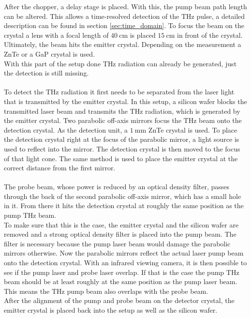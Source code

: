 After the chopper, a delay stage is placed.
With this, the pump beam path length can be altered.
This allows a time-resolved detection of the $\si{\tera\hertz}$ pulse, a detailed description can be found in section \ref{sec:time_domain}.
To focus the beam on the crystal a lens with a focal length of $\SI{40}{\centi\meter}$ is placed $\SI{15}{\centi\meter}$ in front of the crystal.
Ultimately, the beam hits the emitter crystal.
Depending on the measurement a ZnTe or a GaP crystal is used.
\\
With this part of the setup done $\si{\tera\hertz}$ radiation can already be generated, just the detection is still missing.
\\\\
To detect the $\si{\tera\hertz}$ radiation it first needs to be separated from the laser light that is transmitted by the emitter crystal.
In this setup, a silicon wafer blocks the transmitted laser beam and transmits the $\si{\tera\hertz}$ radiation, which is generated by the emitter crystal.
Two parabolic off-axis mirrors focus the $\si{\tera\hertz}$ beam onto the detection crystal.
As the detection unit, a $\SI{1}{\milli\meter}$ ZnTe crystal is used.
To place the detection crystal right at the focus of the parabolic mirror, a light source is used to reflect into the mirror.
The detection crystal is then moved to the focus of that light cone.
The same method is used to place the emitter crystal at the correct distance from the first mirror.
\\\\
The probe beam, whose power is reduced by an optical density filter, passes through the back of the second parabolic off-axis mirror, which has a small hole in it.
From there it hits the detection crystal at roughly the same position as the pump $\si{\tera\hertz}$ beam.
\\
To make sure that this is the case, the emitter crystal and the silicon wafer are removed and a strong optical density filter is placed into the pump beam.
The filter is necessary because the pump laser beam would damage the parabolic mirrors otherwise.
Now the parabolic mirrors reflect the actual laser pump beam onto the detection crystal.
With an infrared viewing camera, it is then possible to see if the pump laser and probe laser overlap.
If that is the case the pump $\si{\tera\hertz}$ beam should be at least roughly at the same position as the pump laser beam.
This means the $\si{\tera\hertz}$ pump beam also overlaps with the probe beam.
\\
After the alignment of the pump and probe beam on the detector crystal, the emitter crystal is placed back into the setup as well as the silicon wafer.

